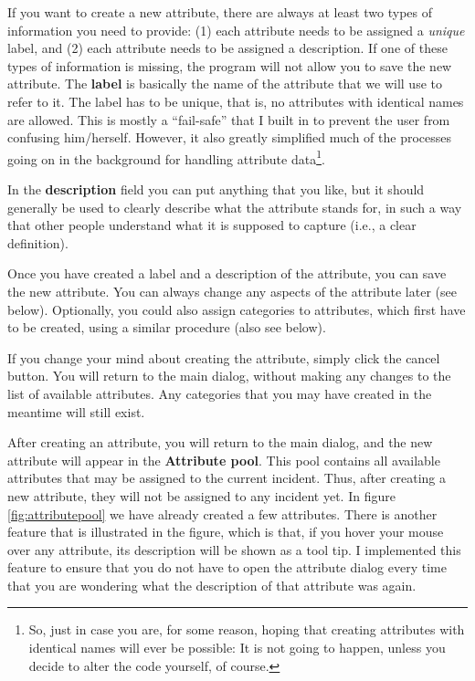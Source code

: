 \documentclass{memoir}
\begin{document}
If you want to create a new attribute, there are always at least two types of information you need to provide: (1) each attribute needs to be assigned a \emph{unique} label, and (2) each attribute needs to be assigned a description. If one of these types of information is missing, the program will not allow you to save the new attribute. The \textbf{label} is basically the name of the attribute that we will use to refer to it. The label has to be unique, that is, no attributes with identical names are allowed. This is mostly a ``fail-safe'' that I built in to prevent the user from confusing him/herself. However, it also greatly simplified much of the processes going on in the background for handling attribute data\footnote{So, just in case you are, for some reason, hoping that creating attributes with identical names will ever be possible: It is not going to happen, unless you decide to alter the code yourself, of course.}.  

In the \textbf{description} field you can put anything that you like, but it should generally be used to clearly describe what the attribute stands for, in such a way that other people understand what it is supposed to capture (i.e., a clear definition).

Once you have created a label and a description of the attribute, you can save the new attribute. You can always change any aspects of the attribute later (see below). Optionally, you could also assign categories to attributes, which first have to be created, using a similar procedure (also see below).

If you change your mind about creating the attribute, simply click the cancel button. You will return to the main dialog, without making any changes to the list of available attributes. Any categories that you may have created in the meantime will still exist. 

After creating an attribute, you will return to the main dialog, and the new attribute will appear in the \textbf{Attribute pool}. This pool contains all available attributes that may be assigned to the current incident. Thus, after creating a new attribute, they will not be assigned to any incident yet. In figure \ref{fig:attributepool} we have already created a few attributes. There is another feature that is illustrated in the figure, which is that, if you hover your mouse over any attribute, its description will be shown as a tool tip. I implemented this feature to ensure that you do not have to open the attribute dialog every time that you are wondering what the description of that attribute was again.
\end{document}
